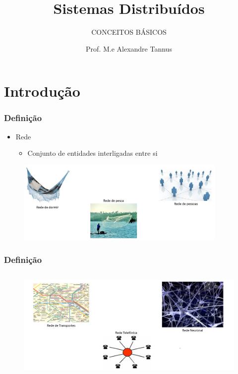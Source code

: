 \documentclass[aspectratio=169,
				xcolor=table]{beamer}
\institute[]{\uppercase{Engenharia de Software}}
\title[]{Sistemas Distribuídos}
\subtitle[]{\uppercase{Conceitos Básicos}}
\author[]{Prof. M.e Alexandre Tannus}
\date{}
\begin{document}
	\begin{frame}
		\titlepage		
	\end{frame}

	\begin{frame}
		\tableofcontents
	\end{frame}	

	\section{Introdução}
	\begin{frame}
		\frametitle{Definição}
		\begin{itemize}
			\item Rede
			\begin{itemize}
				\item Conjunto de entidades interligadas entre si
			\end{itemize}
		\end{itemize}
		\begin{figure}
			\includegraphics[height=4cm, keepaspectratio]{../figs/cap01/redes01.png} 
		\end{figure}
	\end{frame}

	\begin{frame}
		\frametitle{Definição}
		\begin{figure}
			\includegraphics[height=5.5cm, keepaspectratio]{../figs/cap01/redes02.png} 
		\end{figure}
	\end{frame}	
	
\end{document}
